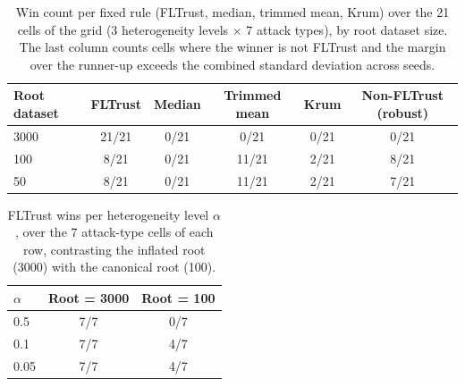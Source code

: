 
\begin{table}[t]
\centering
\caption{Win count per fixed rule (FLTrust, median, trimmed mean, Krum) over the 21 cells of the grid (3 heterogeneity levels $\times$ 7 attack types), by root dataset size. The last column counts cells where the winner is not FLTrust and the margin over the runner-up exceeds the combined standard deviation across seeds.}
\label{tab:root-size-wins}
\begin{tabular}{lccccc}
\toprule
Root dataset & FLTrust & Median & Trimmed mean & Krum & Non-FLTrust (robust) \\
\midrule
3000 & 21/21 & 0/21 & 0/21 & 0/21 & 0/21 \\
100 & 8/21 & 0/21 & 11/21 & 2/21 & 8/21 \\
50 & 8/21 & 0/21 & 11/21 & 2/21 & 7/21 \\
\bottomrule
\end{tabular}
\end{table}

\begin{table}[t]
\centering
\caption{FLTrust wins per heterogeneity level $\alpha$, over the 7 attack-type cells of each row, contrasting the inflated root (3000) with the canonical root (100).}
\label{tab:fltrust-by-alpha}
\begin{tabular}{lcc}
\toprule
$\alpha$ & Root = 3000 & Root = 100 \\
\midrule
0.5 & 7/7 & 0/7 \\
0.1 & 7/7 & 4/7 \\
0.05 & 7/7 & 4/7 \\
\bottomrule
\end{tabular}
\end{table}

